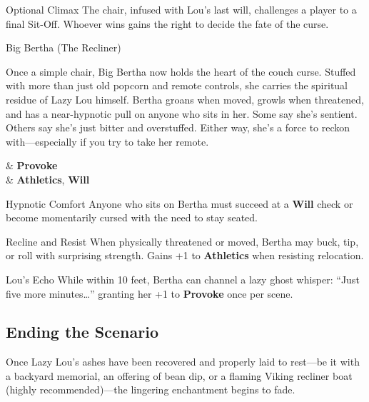 \begin{multicols}{2}
\begin{CommentBox}{Optional Climax}
The chair, infused with Lou’s last will, challenges a player to a final Sit-Off. Whoever wins gains the right to decide the fate of the curse.
\end{CommentBox}


\begin{NPC}[description={Haunted, Heavy, Deeply Resentful of Standing}]{Big Bertha (The Recliner)}

    Once a simple chair, Big Bertha now holds the heart of the couch curse. Stuffed with more than just old popcorn and remote controls, she carries the spiritual residue of Lazy Lou himself. Bertha groans when moved, growls when threatened, and has a near-hypnotic pull on anyone who sits in her. Some say she’s sentient. Others say she’s just bitter and overstuffed. Either way, she’s a force to reckon with—especially if you try to take her remote.

    \vspace{0.5\baselineskip}
    \begin{SkillsBox}
        \Skilled & \textbf{Provoke} \\
        \Novice  & \textbf{Athletics}, \textbf{Will}
    \end{SkillsBox}

    \begin{TraitsBox}
        \item[Hypnotic Comfort] Anyone who sits on Bertha must succeed at a \textbf{Will} check  or become momentarily cursed with the need to stay seated.
        \item[Recline and Resist] When physically threatened or moved, Bertha may buck, tip, or roll with surprising strength. Gains +1 to \textbf{Athletics} when resisting relocation.
        \item[Lou’s Echo] While within 10 feet, Bertha can channel a lazy ghost whisper: “Just five more minutes…” granting her +1 to \textbf{Provoke} once per scene.
    \end{TraitsBox}

    \DamageBox[%
        totalfatigue=2,%
        totalmild=1,totalmoderate=1,totalsevere=0,%
    ]
\end{NPC}

\subsection{Ending the Scenario}

Once Lazy Lou’s ashes have been recovered and properly laid to rest—be it with a backyard memorial, an offering of bean dip, or a flaming Viking recliner boat (highly recommended)—the lingering enchantment begins to fade.


\end{multicols}
